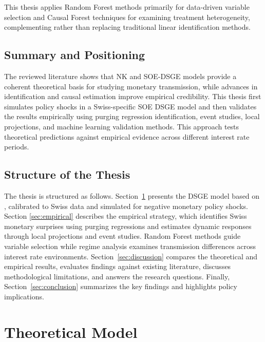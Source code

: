 \documentclass[12pt,a4paper]{article}
\begin{document}
This thesis applies Random Forest methods primarily for data-driven variable selection and Causal Forest techniques for examining treatment heterogeneity, complementing rather than replacing traditional linear identification methods. 

\subsection{Summary and Positioning}
The reviewed literature shows that NK and SOE-DSGE models provide a coherent theoretical basis for studying monetary transmission, while advances in identification and causal estimation improve empirical credibility. This thesis first simulates policy shocks in a Swiss-specific SOE DSGE model and then validates the results empirically using purging regression identification, event studies, local projections, and machine learning validation methods. This approach tests theoretical predictions against empirical evidence across different interest rate periods.

\subsection{Structure of the Thesis}
\label{subsec:structure}

The thesis is structured as follows.  
Section~\ref{sec:dsge} presents the DSGE model based on \citet{gali2008}, calibrated to Swiss data and simulated for negative monetary policy shocks.  
Section \ref{sec:empirical} describes the empirical strategy, which identifies Swiss monetary surprises using purging regressions and estimates dynamic responses through local projections and event studies. Random Forest methods guide variable selection while regime analysis examines transmission differences across interest rate environments.
Section~\ref{sec:discussion} compares the theoretical and empirical results, 
evaluates findings against existing literature, discusses methodological 
limitations, and answers the research questions. Finally, 
Section~\ref{sec:conclusion} summarizes the key findings and highlights 
policy implications.

\newpage
\section{Theoretical Model}
\label{sec:dsge}
\end{document}

